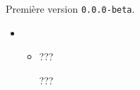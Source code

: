 Première version \verb+0.0.0-beta+.

\begin{itemize}[itemsep=.5em]
    \item {}
    \begin{itemize}[itemsep=.5em]
        \item ???

              \smallskip

              ???
    \end{itemize}
    
    \separation
\end{itemize}